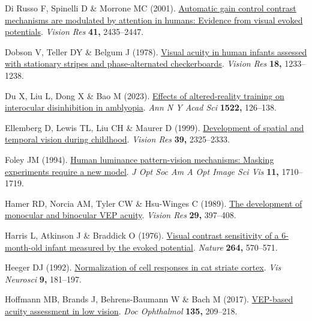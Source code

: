 \documentclass[
  letterpaper,
  DIV=11,
  numbers=noendperiod]{scrartcl}
\newlength{\cslhangindent}
\newenvironment{CSLReferences}[2] %
 {\begin{list}{}{%
  \setlength{\itemindent}{0pt}
  \setlength{\leftmargin}{0pt}
  \setlength{\parsep}{0pt}
  \ifodd #1
   \setlength{\leftmargin}{\cslhangindent}
   \setlength{\itemindent}{-1\cslhangindent}
  \fi
  \setlength{\itemsep}{#2\baselineskip}}}
 {\end{list}}
\begin{document}
\begin{CSLReferences}{1}{1}
Di Russo F, Spinelli D \& Morrone MC (2001).
\href{https://doi.org/10.1016/s0042-6989(01)00134-1}{Automatic gain
control contrast mechanisms are modulated by attention in humans:
Evidence from visual evoked potentials}. \emph{Vision Res} \textbf{41,}
2435--2447.

Dobson V, Teller DY \& Belgum J (1978).
\href{https://doi.org/10.1016/0042-6989(78)90109-8}{Visual acuity in
human infants assessed with stationary stripes and phase-alternated
checkerboards}. \emph{Vision Res} \textbf{18,} 1233--1238.

Du X, Liu L, Dong X \& Bao M (2023).
\href{https://doi.org/10.1111/nyas.14969}{Effects of altered-reality
training on interocular disinhibition in amblyopia}. \emph{Ann N Y Acad
Sci} \textbf{1522,} 126--138.

Ellemberg D, Lewis TL, Liu CH \& Maurer D (1999).
\href{https://doi.org/10.1016/s0042-6989(98)00280-6}{Development of
spatial and temporal vision during childhood}. \emph{Vision Res}
\textbf{39,} 2325--2333.

Foley JM (1994). \href{https://doi.org/10.1364/josaa.11.001710}{Human
luminance pattern-vision mechanisms: Masking experiments require a new
model}. \emph{J Opt Soc Am A Opt Image Sci Vis} \textbf{11,} 1710--1719.

Hamer RD, Norcia AM, Tyler CW \& Hsu-Winges C (1989).
\href{https://doi.org/10.1016/0042-6989(89)90004-7}{The development of
monocular and binocular VEP acuity}. \emph{Vision Res} \textbf{29,}
397--408.

Harris L, Atkinson J \& Braddick O (1976).
\href{https://doi.org/10.1038/264570a0}{Visual contrast sensitivity of a
6-month-old infant measured by the evoked potential}. \emph{Nature}
\textbf{264,} 570--571.

Heeger DJ (1992).
\href{https://doi.org/10.1017/s0952523800009640}{Normalization of cell
responses in cat striate cortex}. \emph{Vis Neurosci} \textbf{9,}
181--197.

Hoffmann MB, Brands J, Behrens-Baumann W \& Bach M (2017).
\href{https://doi.org/10.1007/s10633-017-9613-y}{VEP-based acuity
assessment in low vision}. \emph{Doc Ophthalmol} \textbf{135,} 209--218.


\end{CSLReferences}
\end{document}
